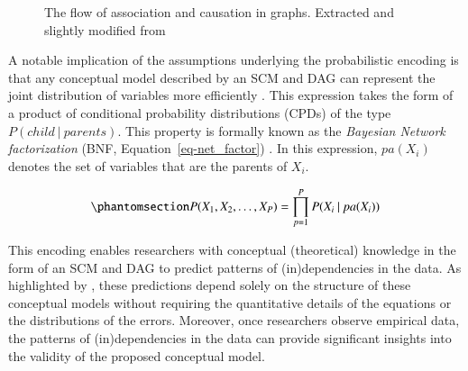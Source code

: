 \documentclass[
  authoryear,
  review,
  1p]{elsarticle}
\begin{document}
\begin{figure}


\caption{\label{fig-ACflow}The flow of association and causation in
graphs. Extracted and slightly modified from \citet[pp.~31]{Neal_2020}}

\end{figure}%

A notable implication of the assumptions underlying the probabilistic
encoding is that any conceptual model described by an SCM and DAG can
represent the joint distribution of variables more efficiently
\citep[pp.~29]{Pearl_et_al_2016}. This expression takes the form of a
product of conditional probability distributions (CPDs) of the type
\(P(child \:|\:parents)\). This property is formally known as the
\emph{Bayesian Network factorization} (BNF,
Equation~\ref{eq-net_factor})
\citetext{\citealp[pp.~29]{Pearl_et_al_2016}; \citealp[pp.~21]{Neal_2020}}.
In this expression, \(pa(X_{i})\) denotes the set of variables that are
the parents of \(X_{i}\).

\begin{equation}\phantomsection\label{eq-net_factor}{
P(X_{1}, X_{2}, \dots, X_{P}) = \prod^{P}_{p=1} P(X_{i} \:|\:pa(X_{i}) )
}\end{equation}

This encoding enables researchers with conceptual (theoretical)
knowledge in the form of an SCM and DAG to predict patterns of
(in)dependencies in the data. As highlighted by
\citet[pp.~35]{Pearl_et_al_2016}, these predictions depend solely on the
structure of these conceptual models without requiring the quantitative
details of the equations or the distributions of the errors. Moreover,
once researchers observe empirical data, the patterns of
(in)dependencies in the data can provide significant insights into the
validity of the proposed conceptual model.
\end{document}
